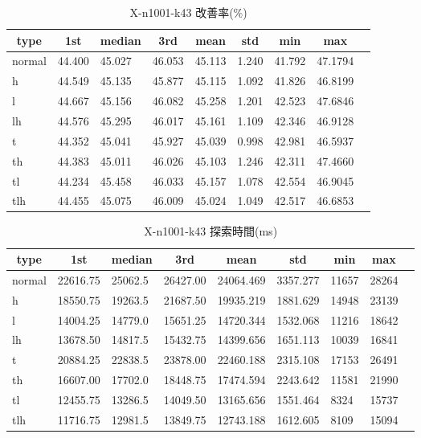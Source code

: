 \begin{table}[htbp]
    \caption{X-n1001-k43 改善率(\%)}
    \begin{tabular}{|l|l|l|l|l|l|l|l|l|}\hline
    \multicolumn{1}{|c|}{\textbf{type}}
    &\multicolumn{1}{|c|}{\textbf{1st}}
    &\multicolumn{1}{c|}{\textbf{median}}
    &\multicolumn{1}{c|}{\textbf{3rd}}
    &\multicolumn{1}{c|}{\textbf{mean}}
    &\multicolumn{1}{c|}{\textbf{std}}
    &\multicolumn{1}{c|}{\textbf{min}}
    &\multicolumn{1}{c|}{\textbf{max}}\\\hline
	normal & 44.400 & 45.027 & 46.053 & 45.113 & 1.240 & 41.792 & 47.1794\\\hline
	h & 44.549 & 45.135 & 45.877 & 45.115 & 1.092 & 41.826 & 46.8199\\\hline
	l & 44.667 & 45.156 & 46.082 & 45.258 & 1.201 & 42.523 & 47.6846\\\hline
	lh & 44.576 & 45.295 & 46.017 & 45.161 & 1.109 & 42.346 & 46.9128\\\hline
	t & 44.352 & 45.041 & 45.927 & 45.039 & 0.998 & 42.981 & 46.5937\\\hline
	th & 44.383 & 45.011 & 46.026 & 45.103 & 1.246 & 42.311 & 47.4660\\\hline
	tl & 44.234 & 45.458 & 46.033 & 45.157 & 1.078 & 42.554 & 46.9045\\\hline
	tlh & 44.455 & 45.075 & 46.009 & 45.024 & 1.049 & 42.517 & 46.6853\\\hline
	\end{tabular}
\end{table}
\begin{table}[htbp]
    \caption{X-n1001-k43 探索時間(ms)}
    \begin{tabular}{|l|l|l|l|l|l|l|l|l|}\hline
    \multicolumn{1}{|c|}{\textbf{type}}
    &\multicolumn{1}{|c|}{\textbf{1st}}
    &\multicolumn{1}{c|}{\textbf{median}}
    &\multicolumn{1}{c|}{\textbf{3rd}}
    &\multicolumn{1}{c|}{\textbf{mean}}
    &\multicolumn{1}{c|}{\textbf{std}}
    &\multicolumn{1}{c|}{\textbf{min}}
    &\multicolumn{1}{c|}{\textbf{max}}\\\hline
	normal & 22616.75 & 25062.5 & 26427.00 & 24064.469 & 3357.277 & 11657 & 28264\\\hline
	h & 18550.75 & 19263.5 & 21687.50 & 19935.219 & 1881.629 & 14948 & 23139\\\hline
	l & 14004.25 & 14779.0 & 15651.25 & 14720.344 & 1532.068 & 11216 & 18642\\\hline
	lh & 13678.50 & 14817.5 & 15432.75 & 14399.656 & 1651.113 & 10039 & 16841\\\hline
	t & 20884.25 & 22838.5 & 23878.00 & 22460.188 & 2315.108 & 17153 & 26491\\\hline
	th & 16607.00 & 17702.0 & 18448.75 & 17474.594 & 2243.642 & 11581 & 21990\\\hline
	tl & 12455.75 & 13286.5 & 14049.50 & 13165.656 & 1551.464 & 8324 & 15737\\\hline
	tlh & 11716.75 & 12981.5 & 13849.75 & 12743.188 & 1612.605 & 8109 & 15094\\\hline
	\end{tabular}
\end{table}
